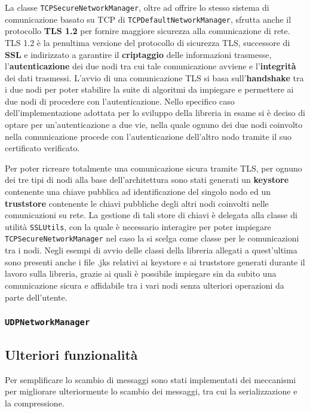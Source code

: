 La classe \texttt{TCPSecureNetworkManager}, oltre ad offrire lo stesso sistema di comunicazione basato su TCP di \texttt{TCPDefaultNetworkManager}, sfrutta anche il protocollo
\textbf{TLS 1.2} per fornire maggiore sicurezza alla comunicazione di rete. 
TLS 1.2 è la penultima versione del protocollo di sicurezza TLS, successore di \textbf{SSL} e indirizzato a garantire il \textbf{criptaggio} delle informazioni trasmesse,
l'\textbf{autenticazione} dei due nodi tra cui tale comunicazione avviene e l'\textbf{integrità} dei dati trasmessi.
L'avvio di una comunicazione TLS si basa sull'\textbf{handshake} tra i due nodi per poter stabilire la suite di algoritmi da impiegare e permettere ai due nodi di procedere con l'autenticazione.
Nello specifico caso dell'implementazione adottata per lo sviluppo della libreria in esame si è deciso di optare per un'autenticazione a due vie, nella quale ognuno dei due nodi coinvolto nella comunicazione
procede con l'autenticazione dell'altro nodo tramite il suo certificato verificato.

Per poter ricreare totalmente una comunicazione sicura tramite TLS, per ognuno dei tre tipi di nodi alla base dell'architettura sono stati generati un \textbf{keystore} contenente una chiave pubblica ad identificazione del singolo nodo ed un \textbf{truststore} contenente le chiavi pubbliche degli altri nodi coinvolti nelle comunicazioni su rete.
La gestione di tali store di chiavi è delegata alla classe di utilità \texttt{SSLUtils}, con la quale è necessario interagire per poter impiegare \texttt{TCPSecureNetworkManager} nel caso la si scelga come classe per le comunicazioni tra i nodi.
Negli esempi di avvio delle classi della libreria allegati a quest'ultima sono presenti anche i file .jks relativi ai keystore e ai truststore generati durante il lavoro sulla libreria, grazie ai quali è possibile impiegare sin da subito una comunicazione sicura e affidabile tra i vari nodi senza ulteriori operazioni da parte dell'utente.

\subsubsection{\texttt{UDPNetworkManager}}

\subsection{Ulteriori funzionalità}

Per semplificare lo scambio di messaggi sono stati implementati dei meccanismi per migliorare ulteriormente lo scambio dei messaggi, tra cui la serializzazione e la compressione.

